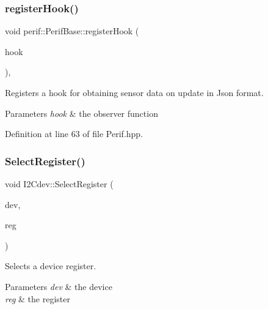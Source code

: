 \subsubsection{\texorpdfstring{registerHook()}{registerHook()}}
{\footnotesize\ttfamily void perif\+::\+Perif\+Base\+::register\+Hook (\begin{DoxyParamCaption}\item[{function$<$ void(\mbox{\hyperlink{Perif_8hpp_a358ff4ee6d24694ee7661f0cce14377e}{Dev\+Map}} \&)$>$ \&\&}]{hook }\end{DoxyParamCaption})\hspace{0.3cm}{\ttfamily [inline]}, {\ttfamily [inherited]}}

Registers a hook for obtaining sensor data on update in Json format.


\begin{DoxyParams}{Parameters}
{\em hook} & the observer function \\
\hline
\end{DoxyParams}


Definition at line 63 of file Perif.\+hpp.


\begin{DoxyCode}{0}

\end{DoxyCode}
\mbox{\label{classI2Cdev_a3be31bf7d3f40bb215d8854aac945db3}} 
\subsubsection{\texorpdfstring{SelectRegister()}{SelectRegister()}}
{\footnotesize\ttfamily void I2\+Cdev\+::\+Select\+Register (\begin{DoxyParamCaption}\item[{uint8\+\_\+t}]{dev,  }\item[{uint8\+\_\+t}]{reg }\end{DoxyParamCaption})\hspace{0.3cm}{\ttfamily [inherited]}}

Selects a device register.


\begin{DoxyParams}{Parameters}
{\em dev} & the device \\
\hline
{\em reg} & the register \\
\hline
\end{DoxyParams}


